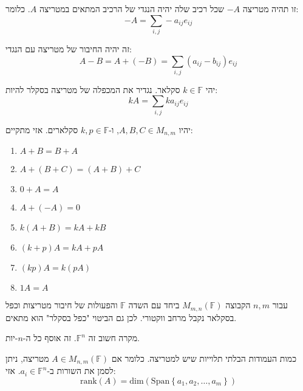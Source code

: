\documentclass{tstextbook}
\begin{document}
\begin{definition}
זו תהיה מטריצה \(-A\) שכל רכיב שלה יהיה הנגדי של הרכיב המתאים במטריצה \(A\). כלומר:
$$-A=\sum_{i,j}-a_{i j} e_{ij}$$

\end{definition}
\begin{definition}
זה יהיה החיבור של מטריצה עם הנגדי:
$$A-B=A+(-B)=\sum_{i,j}(a_{i j}-b_{i j})e_{ij}$$

\end{definition}
\begin{definition}
יהי \(k \in \mathbb{F}\) סקלאר. נגדיר את המכפלה של מטריצה בסקלר להיות:
$$k A=\sum _{i,j}k a_{i j}e_{ij}$$

\end{definition}
\begin{proposition}
יהיו \(A,B,C\in M_{n,m}\), ו-\(k,p \in \mathbb{F}\) סקלארים. אזי מתקיים:

  \begin{enumerate}
    \item \(A+B=B+A\)


    \item \(A+(B+C)=(A+B)+C\)


    \item \(0+A=A\)


    \item \(A+(-A)=0\)


    \item \(k(A+B)=kA+kB\)


    \item \((k+p)A=kA+pA\)


    \item \((kp)A=k(pA)\)


    \item \(1A=A\)


  \end{enumerate}
\end{proposition}
\begin{corollary}
עבור \(n,m\) הקבוצה \(M_{m,n}\left( \mathbb{F}  \right)\) ביחד עם השדה \(\mathbb{F}\) והפעולות של חיבור מטריצות וכפל בסקלאר נקבל מרחב ווקטורי. לכן גם הביטוי "כפל בסקלר" הוא מתאים.

\end{corollary}
\begin{example}
מקרה חשוב זה \(\mathbb{F} ^{n}\). זה אוסף כל ה-\(n\)-יות.

\end{example}
\begin{definition}
כמות העמודות הבלתי תלוייות שיש למטריצה. כלומר אם \(A \in M_{n,m}\left( \mathbb{F}  \right)\) מטריצה, ניתן לסמן את השורות ב-\(a_{i}\in \mathbb{F} ^{n}\). אזי:
$$\mathrm{rank}(A)=\mathrm{dim}\left( \mathrm{Span}\left\{  a_{1},a_{2},\dots,a_{m}  \right\} \right)$$

\end{definition}
\end{document}
